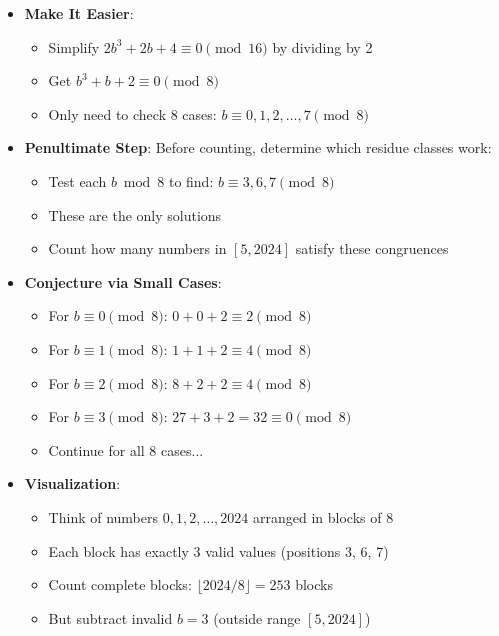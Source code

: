 \documentclass[11pt]{article}
\begin{document}
\begin{strategicbox}
\begin{itemize}[leftmargin=*]
    \item \textbf{Make It Easier}: 
    \begin{itemize}
        \item Simplify $2b^3 + 2b + 4 \equiv 0 \pmod{16}$ by dividing by 2
        \item Get $b^3 + b + 2 \equiv 0 \pmod{8}$
        \item Only need to check 8 cases: $b \equiv 0, 1, 2, \ldots, 7 \pmod{8}$
    \end{itemize}
    
    \item \textbf{Penultimate Step}: Before counting, determine which residue classes work:
    \begin{itemize}
        \item Test each $b \bmod 8$ to find: $b \equiv 3, 6, 7 \pmod{8}$
        \item These are the only solutions
        \item Count how many numbers in $[5, 2024]$ satisfy these congruences
    \end{itemize}
    
    \item \textbf{Conjecture via Small Cases}: 
    \begin{itemize}
        \item For $b \equiv 0 \pmod{8}$: $0 + 0 + 2 \equiv 2 \pmod{8}$ \texttimes
        \item For $b \equiv 1 \pmod{8}$: $1 + 1 + 2 \equiv 4 \pmod{8}$ \texttimes
        \item For $b \equiv 2 \pmod{8}$: $8 + 2 + 2 \equiv 4 \pmod{8}$ \texttimes
        \item For $b \equiv 3 \pmod{8}$: $27 + 3 + 2 = 32 \equiv 0 \pmod{8}$ \checkmark
        \item Continue for all 8 cases...
    \end{itemize}
    
    \item \textbf{Visualization}: 
    \begin{itemize}
        \item Think of numbers $0, 1, 2, \ldots, 2024$ arranged in blocks of 8
        \item Each block has exactly 3 valid values (positions 3, 6, 7)
        \item Count complete blocks: $\lfloor 2024/8 \rfloor = 253$ blocks
        \item But subtract invalid $b = 3$ (outside range $[5, 2024]$)
    \end{itemize}
\end{itemize}


\end{strategicbox}
\end{document}
